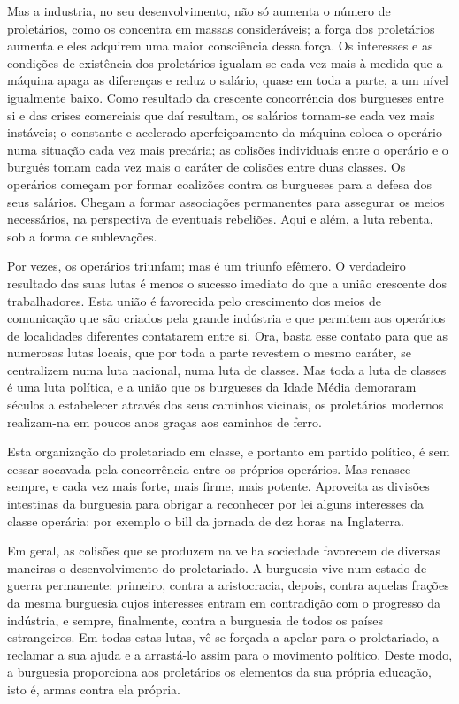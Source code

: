 Mas a industria, no seu desenvolvimento, não só aumenta o número de
proletários, como os concentra em massas consideráveis; a força dos
proletários aumenta e eles adquirem uma maior consciência dessa
força. Os interesses e as condições de existência dos proletários
igualam-se cada vez mais à medida que a máquina apaga as diferenças e
reduz o salário, quase em toda a parte, a um nível igualmente
baixo. Como resultado da crescente concorrência dos burgueses entre si
e das crises comerciais que daí resultam, os salários tornam-se cada
vez mais instáveis; o constante e acelerado aperfeiçoamento da máquina
coloca o operário numa situação cada vez mais precária; as colisões
individuais entre o operário e o burguês tomam cada vez mais o caráter
de colisões entre duas classes. Os operários começam por formar
coalizões contra os burgueses para a defesa dos seus
salários. Chegam a formar associações permanentes para assegurar os
meios necessários, na perspectiva de eventuais rebeliões. Aqui e além,
a luta rebenta, sob a forma de sublevações.

Por vezes, os operários triunfam; mas é um triunfo efêmero. O
verdadeiro resultado das suas lutas é menos o sucesso imediato do que
a união crescente dos trabalhadores. Esta união é favorecida pelo
crescimento dos meios de comunicação que são criados pela grande
indústria e que permitem aos operários de localidades diferentes
contatarem entre si. Ora, basta esse contato para que as numerosas
lutas locais, que por toda a parte revestem o mesmo caráter, se
centralizem numa luta nacional, numa luta de classes. Mas toda a luta
de classes é uma luta política, e a união que os burgueses da Idade
Média demoraram séculos a estabelecer através dos seus caminhos
vicinais, os proletários modernos realizam-na em poucos anos graças
aos caminhos de ferro.

Esta organização do proletariado em classe, e portanto em partido
político, é sem cessar socavada pela concorrência entre os próprios
operários. Mas renasce sempre, e cada vez mais forte, mais firme, mais
potente. Aproveita as divisões intestinas da burguesia para obrigar a
reconhecer por lei alguns interesses da classe operária: por exemplo o
bill da jornada de dez horas na Inglaterra.

Em geral, as colisões que se produzem na velha sociedade favorecem de
diversas maneiras o desenvolvimento do proletariado. A burguesia vive
num estado de guerra permanente: primeiro, contra a aristocracia,
depois, contra aquelas frações da mesma burguesia cujos interesses
entram em contradição com o progresso da indústria, e sempre,
finalmente, contra a burguesia de todos os países estrangeiros. Em
todas estas lutas, vê-se forçada a apelar para o proletariado, a
reclamar a sua ajuda e a arrastá-lo assim para o movimento
político. Deste modo, a burguesia proporciona aos proletários os
elementos da sua própria educação, isto é, armas contra ela própria.

